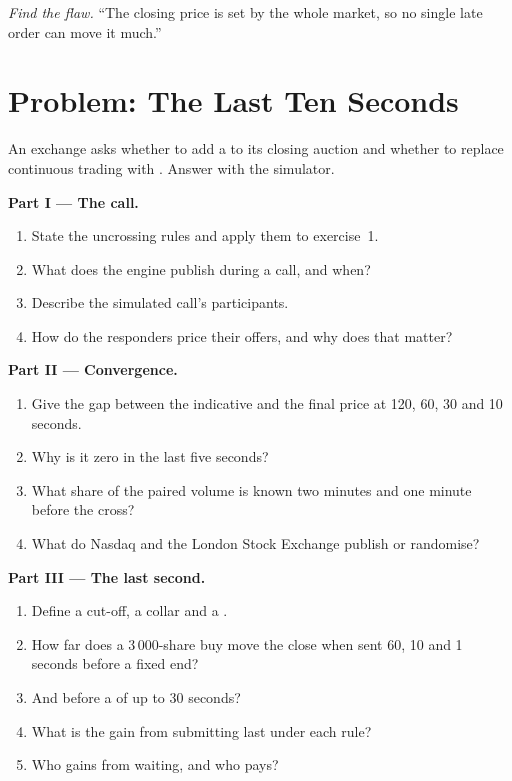 \begin{exercise}[$\star\star\star$]\label{exo:mx:auction-mechanics-and-theory:8}
\emph{Find the flaw.} ``The closing price is set by the whole market, so no single late order can move it much.''
\end{exercise}

\section{Problem: The Last Ten Seconds}

\begin{problem}\label{pb:mx:auction-mechanics-and-theory:1}
An exchange asks whether to add a  to its closing auction and whether to replace continuous trading with . Answer with the
simulator.

\medskip\noindent\textbf{Part I --- The call.}
\begin{enumerate}
\item State the uncrossing rules and apply them to exercise~1.
\item What does the engine publish during a call, and when?
\item Describe the simulated call's participants.
\item How do the responders price their offers, and why does that matter?
\end{enumerate}

\medskip\noindent\textbf{Part II --- Convergence.}
\begin{enumerate}[resume]
\item Give the gap between the indicative and the final price at 120, 60, 30 and 10 seconds.
\item Why is it zero in the last five seconds?
\item What share of the paired volume is known two minutes and one minute before the cross?
\item What do Nasdaq and the London Stock Exchange publish or randomise?
\end{enumerate}

\medskip\noindent\textbf{Part III --- The last second.}
\begin{enumerate}[resume]
\item Define a cut-off, a collar and a .
\item How far does a 3\,000-share buy move the close when sent 60, 10 and 1 seconds before a fixed end?
\item And before a  of up to 30 seconds?
\item What is the gain from submitting last under each rule?
\item Who gains from waiting, and who pays?
\end{enumerate}


\end{problem}
